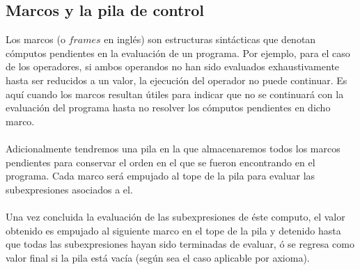 \bigskip

 \subsection{Marcos y la pila de control}
  Los marcos (o $frames$ en inglés) son estructuras sintácticas que denotan cómputos pendientes en la evaluación de un programa. Por ejemplo, para el caso de los operadores, si ambos operandos no han sido evaluados exhaustivamente hasta ser reducidos a un valor, la ejecución del operador no puede continuar.
 Es aquí cuando los marcos resultan útiles para indicar que no se continuará con la evaluación del programa hasta no resolver los cómputos pendientes en dicho marco.\\\\
Adicionalmente tendremos una pila en la que almacenaremos todos los marcos pendientes para conservar el orden en el que se fueron encontrando en el programa.  Cada marco será empujado al tope de la pila para evaluar las subexpresiones asociados a el. \\\\
Una vez concluida la evaluación de las subexpresiones de éste computo, el valor obtenido es empujado al siguiente marco en el tope de la pila y detenido hasta que todas las subexpresiones hayan sido terminadas de evaluar, ó se regresa como valor final si la pila está vacía (según sea el caso aplicable por axioma). \\\\
